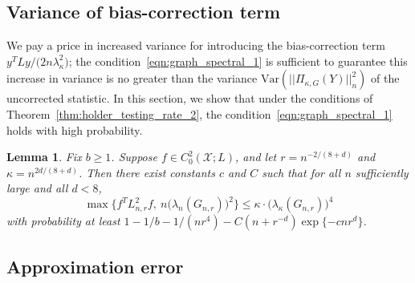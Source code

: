 \documentclass{article}
\newcommand{\Var}{\mathrm{Var}}
\newcommand{\1}{\mathbf{1}}
\newcommand{\Xset}{\mathcal{X}}
\theoremstyle{alden}
\theoremstyle{aldenthm}
\newtheorem{lemma}{Lemma}
\theoremstyle{definition}
\theoremstyle{remark}
\begin{document}
\subsection{Variance of bias-correction term}

We pay a price in increased variance for introducing the bias-correction term $y^T L y/\bigl(2 n \lambda_{\kappa}^2\bigr)$; the condition~\eqref{eqn:graph_spectral_1} is sufficient to guarantee this increase in variance is no greater than the variance $\Var(||\Pi_{\kappa,G}(Y)||_n^2)$ of the uncorrected statistic. In this section, we show that under the conditions of Theorem~\ref{thm:holder_testing_rate_2}, the condition~\eqref{eqn:graph_spectral_1} holds with high probability.

\begin{lemma}
	\label{lem:bias_correction_variance}
	Fix $b \geq 1$. Suppose $f \in C_0^2(\Xset;L)$, and let $r = n^{-2/(8 + d)}$ and $\kappa = n^{2d/(8 + d)}$. Then there exist constants $c$ and $C$ such that for all $n$ sufficiently large and all $d < 8$,
	\begin{equation}
	\label{eqn:bias_correction_variance}
	\max\Big\{f^T L_{n,r}^2 f,~ n \bigl(\lambda_n(G_{n,r})\bigr)^2 \Bigr\} \leq \kappa \cdot \bigl(\lambda_{\kappa}(G_{n,r})\bigr)^4
	\end{equation}
	with probability at least $1 - 1/b - 1/(nr^4) - C(n + r^{-d}) \exp\{-c nr^d\}$.
\end{lemma}

\subsection{Approximation error}
\end{document}
